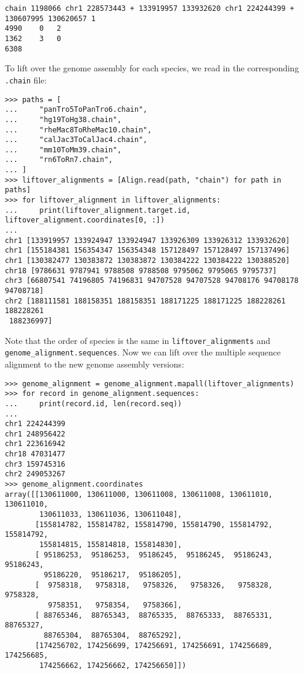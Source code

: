 \begin{verbatim}
chain 1198066 chr1 228573443 + 133919957 133932620 chr1 224244399 + 130607995 130620657 1
4990	0	2
1362	3	0
6308

\end{verbatim}
To lift over the genome assembly for each species, we read in the corresponding \verb+.chain+ file:
\begin{verbatim}
>>> paths = [
...     "panTro5ToPanTro6.chain",
...     "hg19ToHg38.chain",
...     "rheMac8ToRheMac10.chain",
...     "calJac3ToCalJac4.chain",
...     "mm10ToMm39.chain",
...     "rn6ToRn7.chain",
... ]
>>> liftover_alignments = [Align.read(path, "chain") for path in paths]
>>> for liftover_alignment in liftover_alignments:
...     print(liftover_alignment.target.id, liftover_alignment.coordinates[0, :])
...
chr1 [133919957 133924947 133924947 133926309 133926312 133932620]
chr1 [155184381 156354347 156354348 157128497 157128497 157137496]
chr1 [130382477 130383872 130383872 130384222 130384222 130388520]
chr18 [9786631 9787941 9788508 9788508 9795062 9795065 9795737]
chr3 [66807541 74196805 74196831 94707528 94707528 94708176 94708178 94708718]
chr2 [188111581 188158351 188158351 188171225 188171225 188228261 188228261
 188236997]
\end{verbatim}
Note that the order of species is the same in \verb+liftover_alignments+ and \verb+genome_alignment.sequences+. Now we can lift over the multiple sequence alignment to the new genome assembly versions:
\begin{verbatim}
>>> genome_alignment = genome_alignment.mapall(liftover_alignments)
>>> for record in genome_alignment.sequences:
...     print(record.id, len(record.seq))
...
chr1 224244399
chr1 248956422
chr1 223616942
chr18 47031477
chr3 159745316
chr2 249053267
>>> genome_alignment.coordinates
array([[130611000, 130611000, 130611008, 130611008, 130611010, 130611010,
        130611033, 130611036, 130611048],
       [155814782, 155814782, 155814790, 155814790, 155814792, 155814792,
        155814815, 155814818, 155814830],
       [ 95186253,  95186253,  95186245,  95186245,  95186243,  95186243,
         95186220,  95186217,  95186205],
       [  9758318,   9758318,   9758326,   9758326,   9758328,   9758328,
          9758351,   9758354,   9758366],
       [ 88765346,  88765343,  88765335,  88765333,  88765331,  88765327,
         88765304,  88765304,  88765292],
       [174256702, 174256699, 174256691, 174256691, 174256689, 174256685,
        174256662, 174256662, 174256650]])
\end{verbatim}
